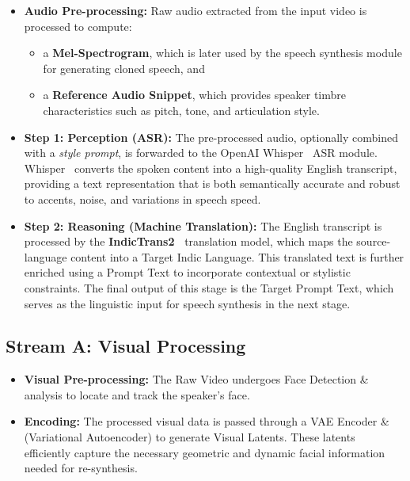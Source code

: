 \documentclass[12pt,oneside]{report}
\begin{document}
\begin{itemize}
    \item \textbf{Audio Pre-processing:}  
    Raw audio extracted from the input video is processed to compute:
    \begin{itemize}
        \item a \textbf{Mel-Spectrogram}, which is later used by the speech synthesis module for generating cloned speech, and
        \item a \textbf{Reference Audio Snippet}, which provides speaker timbre characteristics such as pitch, tone, and articulation style.
    \end{itemize}

    \item \textbf{Step 1: Perception (ASR):}  
    The pre-processed audio, optionally combined with a \textit{style prompt}, is forwarded to the OpenAI Whisper~\cite{radford2023whisper} ASR module. Whisper~\cite{radford2023whisper} converts the spoken content into a high-quality English transcript, providing a text representation that is both semantically accurate and robust to accents, noise, and variations in speech speed.

    \item \textbf{Step 2: Reasoning (Machine Translation):}  
    The English transcript is processed by the \textbf{IndicTrans2~\cite{gala2023indictrans2}} translation model, which maps the source-language content into a Target Indic Language. This translated text is further enriched using a Prompt Text to incorporate contextual or stylistic constraints. The final output of this stage is the Target Prompt Text, which serves as the linguistic input for speech synthesis in the next stage.
\end{itemize}


\subsection{Stream A: Visual Processing}
\begin{itemize}
    \item \textbf{Visual Pre-processing:} The Raw Video undergoes Face Detection \& analysis to locate and track the speaker's face.
    \item \textbf{Encoding:} The processed visual data is passed through a VAE Encoder \& (Variational Autoencoder) to generate Visual Latents. These latents efficiently capture the necessary geometric and dynamic facial information needed for re-synthesis.
\end{itemize}    
\end{document}
